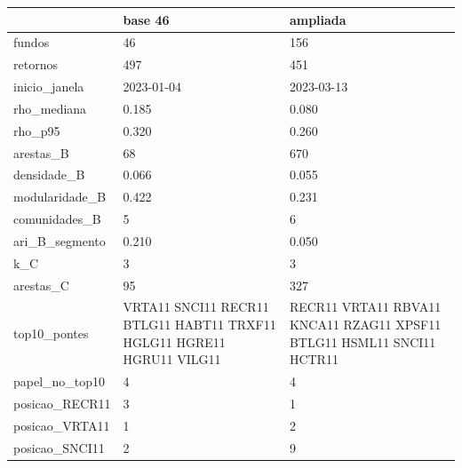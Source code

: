 \begin{tabular}{lll}
\toprule
 & base 46 & ampliada \\
\midrule
fundos & 46 & 156 \\
retornos & 497 & 451 \\
inicio\_janela & 2023-01-04 & 2023-03-13 \\
rho\_mediana & 0.185 & 0.080 \\
rho\_p95 & 0.320 & 0.260 \\
arestas\_B & 68 & 670 \\
densidade\_B & 0.066 & 0.055 \\
modularidade\_B & 0.422 & 0.231 \\
comunidades\_B & 5 & 6 \\
ari\_B\_segmento & 0.210 & 0.050 \\
k\_C & 3 & 3 \\
arestas\_C & 95 & 327 \\
top10\_pontes & VRTA11 SNCI11 RECR11 BTLG11 HABT11 TRXF11 HGLG11 HGRE11 HGRU11 VILG11 & RECR11 VRTA11 RBVA11 KNCA11 RZAG11 XPSF11 BTLG11 HSML11 SNCI11 HCTR11 \\
papel\_no\_top10 & 4 & 4 \\
posicao\_RECR11 & 3 & 1 \\
posicao\_VRTA11 & 1 & 2 \\
posicao\_SNCI11 & 2 & 9 \\
\bottomrule
\end{tabular}

